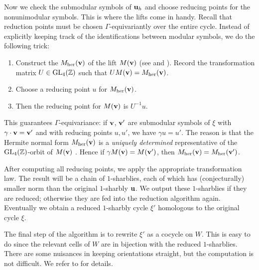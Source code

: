 Now we check the submodular symbols of ${\mathbf {u}}_{h}$ and choose reducing
points for the nonunimodular symbols.  This is where the lifts come in
handy.  Recall that reduction points must be chosen
$\Gamma$-equivariantly over the entire cycle.  Instead of explicitly
keeping track of the identifications between modular symbols, we do
the following trick:
\begin{enumerate}
\item Construct the  $M_{\operatorname{her}}({\mathbf {v}})$ of the lift $M
({\mathbf {v}})$ (see \cite[\S2.4]{cohen:course_ant} and ).  Record the transformation matrix $U \in \operatorname{GL}_{4} (\mathbb{Z})$ such
that $UM({\mathbf {v}} ) = M_{\operatorname{her}} ({\mathbf {v}})$.
\item Choose a reducing point $u$ for $M_{\operatorname{her}} ({\mathbf {v}})$.
\item Then the reducing point for $M ({\mathbf {v}})$ is $U^{-1}u$.
\end{enumerate}
This guarantees $\Gamma$-equivariance: if ${\mathbf {v}}$, ${\mathbf {v}} '$ are submodular
symbols of $\xi$ with $\gamma \cdot {\mathbf {v}} = {\mathbf {v}} '$ and with reducing
points $u, u'$, we have $\gamma u = u'$.  The reason is that the
Hermite normal form $M_{\operatorname{her}} ({\mathbf {v}})$ is a \emph{uniquely determined}
representative of the $\operatorname{GL}_{4}(\mathbb{Z})$-orbit of
$M ({\mathbf {v}})$ \cite{cohen:course_ant}.  Hence if $\gamma M
({\mathbf {v}}) = M ({\mathbf {v}} ')$, then $M_{\operatorname{her}} ({\mathbf {v}}) = M_{\operatorname{her}} ({\mathbf {v}}
')$.

After computing all reducing points, we apply the appropriate
transformation law.  The result will be a chain of $1$-sharblies, each
of which has (conjecturally) smaller norm than the original
$1$-sharbly ${\mathbf {u}}$.  We output these $1$-sharblies if they are reduced;
otherwise they are fed into the reduction algorithm again.  Eventually
we obtain a reduced $1$-sharbly cycle $\xi '$ homologous to the
original cycle $\xi$.

The final step of the algorithm is to rewrite $\xi '$ as a cocycle on
$W$.  This is easy to do since the relevant cells of $W$ are in
bijection with the reduced $1$-sharblies.  There are some nuisances in
keeping orientations straight, but the computation is not difficult.
We refer to \cite{computation} for details.

